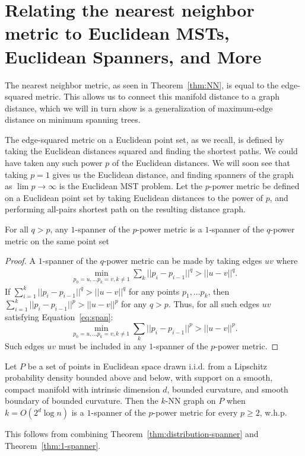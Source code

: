 \section{Relating the nearest neighbor metric to Euclidean MSTs,
Euclidean Spanners, and More}\label{sec:edge-power}
The nearest neighbor metric, as seen in Theorem~\ref{thm:NN}, is equal to
the edge-squared metric. This allows us to connect this manifold distance
to a graph distance, which we will in turn show is a generalization of
maximum-edge distance on minimum spanning trees.

The edge-squared metric on a Euclidean point set, as we recall, is defined by taking the
Euclidean distances squared and finding the shortest paths. 
We could have taken any such power $p$ of the Euclidean distances. We
will soon see that taking $p = 1$ gives us the Euclidean distance, and
finding spanners of the graph as $\lim p\rightarrow \infty$ is the
Euclidean MST problem.  
Let the $p$-power metric be defined on a Euclidean point set by taking
Euclidean distances to the power of $p$, and performing all-pairs
shortest path on the resulting distance graph.
\begin{theorem} \label{thm:1-spanner}
For all $q > p$, any $1$-spanner of the $p$-power metric is a
$1$-spanner of the $q$-power metric on the same point set
\end{theorem}
\begin{proof}
A $1$-spanner of the $q$-power metric can be made by taking
  edges $uv$ where
  \begin{align}\label{eq:span}
    \min_{p_0=u, \ldots p_k=v, k \not= 1} \sum_k ||p_i - p_{i-1}||^q > || u -
v||^q.
  \end{align}
If
  $\sum_{i=1}^k ||p_i - p_{i-1}||^q > || u - v||^q$ for any points
  $p_1, \ldots p_k$, then
  $\sum_{i=1}^k ||p_i - p_{i-1}||^p > || u - v||^p$ for any $q > p$.
  Thus, for all such edges $uv$ satisfying
  Equation~\ref{eq:span}:
  \[ \min_{p_0=u, \ldots p_k=v, k \not= 1} \sum_k ||p_i - p_{i-1}||^p > || u -
  v||^p. \] Such edges $uv$ must be included in any $1$-spanner
  of the $p$-power
  metric.
\end{proof}

 \begin{corollary}
   Let $P$ be a set of points in Euclidean space drawn i.i.d. from a Lipschitz
   probability density bounded above and below, with support on a
   smooth, compact manifold with intrinsic dimension $d$, bounded
   curvature, and
   smooth boundary of bounded curvature. Then the $k$-NN graph on $P$
   when $k = O(2^d \log n)$ is a $1$-spanner of the $p$-power
   metric for every $p \geq 2$, w.h.p.
 \end{corollary}
This follows from combining Theorem~\ref{thm:distribution-spanner} and
Theorem~\ref{thm:1-spanner}.
